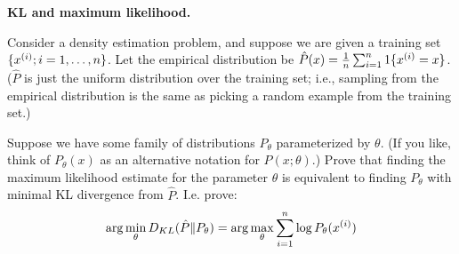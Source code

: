 \item{} \textbf{KL and maximum likelihood.}

Consider a density estimation problem, and suppose we are given a training set $\{x^{(i)}; i=1,\ldots, {n}\}$.  Let the empirical distribution be $\hat{P}(x) = \frac{1}{{n}}\sum_{i=1}^{{n}} 1\{x^{(i)}=x\}$. ($\hat{P}$ is just the uniform distribution over the training set; i.e., sampling from the empirical distribution is the same as picking a random example from the training set.)

Suppose we have some family of distributions $P_\theta$ parameterized by $\theta$.
(If you like, think of $P_\theta(x)$ as an alternative notation for $P(x;\theta)$.)
Prove that finding the maximum likelihood estimate for the parameter $\theta$ is equivalent to finding $P_{\theta}$ with minimal KL divergence from $\hat{P}$. I.e. prove:
\[
\arg\min_\theta D_{KL}(\hat{P}\|P_\theta)
= \arg\max_\theta \sum_{i=1}^{n} \log P_\theta(x^{(i)})
\]
